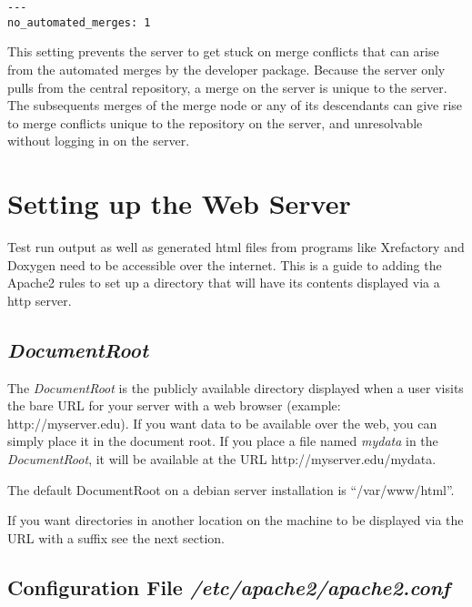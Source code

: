 \documentclass[12pt]{article}
\begin{document}
\begin{verbatim}
---
no_automated_merges: 1
\end{verbatim}

This setting prevents the server to get stuck on merge conflicts that
can arise from the automated merges by the developer package.  Because
the server only pulls from the central repository, a merge on the
server is unique to the server.  The subsequents merges of the merge
node or any of its descendants can give rise to merge conflicts unique
to the repository on the server, and unresolvable without logging in
on the server.


\section*{Setting up the Web Server}

Test run output as well as generated html files from programs like Xrefactory and Doxygen need to be accessible over the internet. This is a guide to adding the Apache2 rules to set up a directory that will have its contents displayed via a http server.

\subsection*{\it DocumentRoot}

The {\it DocumentRoot} is the publicly available directory displayed when a user visits the bare URL for your server with a web browser (example: http://myserver.edu). If you want data to be available over the web, you can simply place it in the document root. If you place a file named {\it mydata} in the {\it DocumentRoot}, it will be available at the URL http://myserver.edu/mydata.

The default DocumentRoot on a debian server installation is ``/var/www/html''. 

If you want directories in another location on the machine to be displayed via the URL with a suffix see the next section.

\subsection*{Configuration File {\it /etc/apache2/apache2.conf}}
\end{document}
